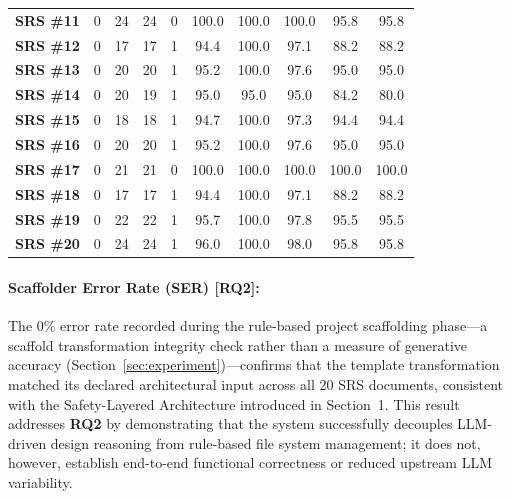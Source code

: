 \begin{table}[htbp]
\begin{tabular}{lccccccccc}
\textbf{SRS \#11} & 0 & 24 & 24 & 0 & 100.0 & 100.0 & 100.0 & 95.8 & 95.8 \\
\textbf{SRS \#12} & 0 & 17 & 17 & 1 & 94.4 & 100.0 & 97.1 & 88.2 & 88.2 \\
\textbf{SRS \#13} & 0 & 20 & 20 & 1 & 95.2 & 100.0 & 97.6 & 95.0 & 95.0 \\
\textbf{SRS \#14} & 0 & 20 & 19 & 1 & 95.0 & 95.0 & 95.0 & 84.2 & 80.0 \\
\textbf{SRS \#15} & 0 & 18 & 18 & 1 & 94.7 & 100.0 & 97.3 & 94.4 & 94.4 \\
\textbf{SRS \#16} & 0 & 20 & 20 & 1 & 95.2 & 100.0 & 97.6 & 95.0 & 95.0 \\
\textbf{SRS \#17} & 0 & 21 & 21 & 0 & 100.0 & 100.0 & 100.0 & 100.0 & 100.0 \\
\textbf{SRS \#18} & 0 & 17 & 17 & 1 & 94.4 & 100.0 & 97.1 & 88.2 & 88.2 \\
\textbf{SRS \#19} & 0 & 22 & 22 & 1 & 95.7 & 100.0 & 97.8 & 95.5 & 95.5 \\
\textbf{SRS \#20} & 0 & 24 & 24 & 1 & 96.0 & 100.0 & 98.0 & 95.8 & 95.8 \\
\bottomrule
\end{tabular}
\end{table}

\paragraph{ Scaffolder Error Rate (SER) [RQ2]:}
The $0\%$ error rate recorded during the rule-based project scaffolding phase---a scaffold transformation integrity check rather than a measure of generative accuracy (Section~\ref{sec:experiment})---confirms that the template transformation matched its declared architectural input across all 20 SRS documents, consistent with the Safety-Layered Architecture introduced in Section~1. This result addresses \textbf{RQ2} by demonstrating that the system successfully decouples LLM-driven design reasoning from rule-based file system management; it does not, however, establish end-to-end functional correctness or reduced upstream LLM variability.

